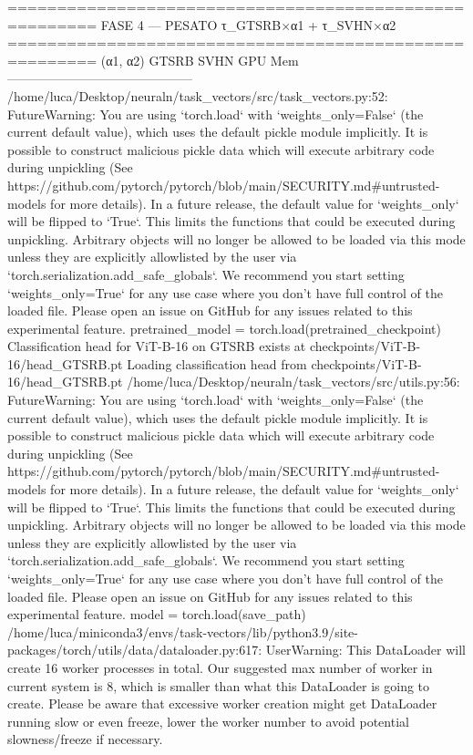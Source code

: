 =======================================================
  FASE 4 — PESATO τ_GTSRB×α1 + τ_SVHN×α2
=======================================================
  (α1,  α2)         GTSRB     SVHN    GPU Mem
  --------------------------------------------
/home/luca/Desktop/neuraln/task_vectors/src/task_vectors.py:52: FutureWarning: You are using `torch.load` with `weights_only=False` (the current default value), which uses the default pickle module implicitly. It is possible to construct malicious pickle data which will execute arbitrary code during unpickling (See https://github.com/pytorch/pytorch/blob/main/SECURITY.md#untrusted-models for more details). In a future release, the default value for `weights_only` will be flipped to `True`. This limits the functions that could be executed during unpickling. Arbitrary objects will no longer be allowed to be loaded via this mode unless they are explicitly allowlisted by the user via `torch.serialization.add_safe_globals`. We recommend you start setting `weights_only=True` for any use case where you don't have full control of the loaded file. Please open an issue on GitHub for any issues related to this experimental feature.
  pretrained_model = torch.load(pretrained_checkpoint)
Classification head for ViT-B-16 on GTSRB exists at checkpoints/ViT-B-16/head_GTSRB.pt
Loading classification head from checkpoints/ViT-B-16/head_GTSRB.pt
/home/luca/Desktop/neuraln/task_vectors/src/utils.py:56: FutureWarning: You are using `torch.load` with `weights_only=False` (the current default value), which uses the default pickle module implicitly. It is possible to construct malicious pickle data which will execute arbitrary code during unpickling (See https://github.com/pytorch/pytorch/blob/main/SECURITY.md#untrusted-models for more details). In a future release, the default value for `weights_only` will be flipped to `True`. This limits the functions that could be executed during unpickling. Arbitrary objects will no longer be allowed to be loaded via this mode unless they are explicitly allowlisted by the user via `torch.serialization.add_safe_globals`. We recommend you start setting `weights_only=True` for any use case where you don't have full control of the loaded file. Please open an issue on GitHub for any issues related to this experimental feature.
  model = torch.load(save_path)
/home/luca/miniconda3/envs/task-vectors/lib/python3.9/site-packages/torch/utils/data/dataloader.py:617: UserWarning: This DataLoader will create 16 worker processes in total. Our suggested max number of worker in current system is 8, which is smaller than what this DataLoader is going to create. Please be aware that excessive worker creation might get DataLoader running slow or even freeze, lower the worker number to avoid potential slowness/freeze if necessary.
